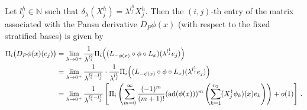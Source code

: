 \documentclass[dvipsnames]{amsart}
\theoremstyle{definition}
\theoremstyle{definition}
\numberwithin{equation}{section}
\begin{document}
Let $l_j^h \in \mathbb{N}$ such that $\delta_{\lambda}(X_j^h) = \lambda^{l_j^h}X_j^h$. Then the $(i,j)$-th entry of the matrix associated with the Pansu derivative
$D_P\phi(x)$ (with respect to the fixed stratified bases) is given by
\begin{align*}
\Pi_i\bigl(D_P\phi(x)(e_j)\bigr)
&=
\lim_{\lambda\to0^+}
\frac{1}{\lambda^{l_i^2}}
\Pi_i\Bigl(
(L_{-\phi(x)}\circ\phi\circ L_x)
(\lambda^{l_j^1}e_j)
\Bigr)\\
&=
\lim_{\lambda\to0^+}
\frac{1}{\lambda^{l_i^2-l_j^1}}
\cdot
\frac{1}{\lambda^{l_j^1}}
\Pi_i\Bigl(
(L_{-\phi(x)}\circ\phi\circ L_x)
(\lambda^{l_j^1}e_j)
\Bigr)\\
&=
\lim_{\lambda\to0^+}
\frac{1}{\lambda^{l_i^2-l_j^1}}
\left[
\Pi_i\left(
\sum_{m=0}^{\infty}
\frac{(-1)^m}{(m+1)!}
(\operatorname{ad}(\phi(x)))^m
\left(
\sum_{k=1}^{n_2}
(X_j^1\phi_k)(x)e_k
\right)
\right)
+o(1)
\right]\,.
\end{align*}
\end{document}
